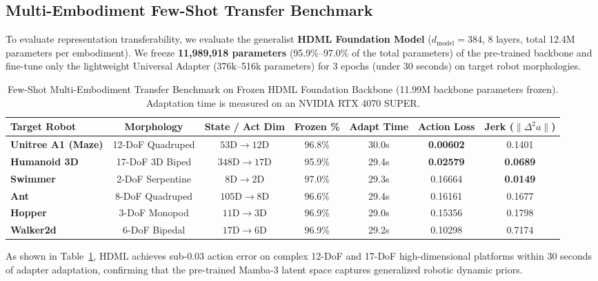 \documentclass{article}
\begin{document}
\subsection{Multi-Embodiment Few-Shot Transfer Benchmark}
To evaluate representation transferability, we evaluate the generalist \textbf{HDML Foundation Model} ($d_{\text{model}}=384$, 8 layers, total 12.4M parameters per embodiment). We freeze \textbf{11,989,918 parameters} (95.9\%--97.0\% of the total parameters) of the pre-trained backbone and fine-tune only the lightweight Universal Adapter (376k--516k parameters) for 3 epochs (under 30 seconds) on target robot morphologies.

\begin{table}[h]
\centering
\caption{Few-Shot Multi-Embodiment Transfer Benchmark on Frozen HDML Foundation Backbone (11.99M backbone parameters frozen). Adaptation time is measured on an NVIDIA RTX 4070 SUPER.}
\label{tab:foundation_benchmark}
\small
\begin{tabular}{lcccccc}
\toprule
\textbf{Target Robot} & \textbf{Morphology} & \textbf{State / Act Dim} & \textbf{Frozen \%} & \textbf{Adapt Time} & \textbf{Action Loss} & \textbf{Jerk ($\|\Delta^2 a\|$)} \\
\midrule
\textbf{Unitree A1 (Maze)}   & 12-DoF Quadruped    & $53\text{D} \to 12\text{D}$ & 96.8\% & 30.0s & \textbf{0.00602} & 0.1401 \\
\textbf{Humanoid 3D}         & 17-DoF 3D Biped     & $348\text{D} \to 17\text{D}$ & 95.9\% & 29.4s & \textbf{0.02579} & \textbf{0.0689} \\
\textbf{Swimmer}             & 2-DoF Serpentine    & $8\text{D} \to 2\text{D}$   & 97.0\% & 29.3s & 0.16664 & \textbf{0.0149} \\
\textbf{Ant}                 & 8-DoF Quadruped     & $105\text{D} \to 8\text{D}$ & 96.6\% & 29.4s & 0.16161 & 0.1677 \\
\textbf{Hopper}              & 3-DoF Monopod       & $11\text{D} \to 3\text{D}$  & 96.9\% & 29.0s & 0.15356 & 0.1798 \\
\textbf{Walker2d}            & 6-DoF Bipedal       & $17\text{D} \to 6\text{D}$  & 96.9\% & 29.2s & 0.10298 & 0.7174 \\
\bottomrule
\end{tabular}
\end{table}

As shown in Table~\ref{tab:foundation_benchmark}, HDML achieves sub-0.03 action error on complex 12-DoF and 17-DoF high-dimensional platforms within 30 seconds of adapter adaptation, confirming that the pre-trained Mamba-3 latent space captures generalized robotic dynamic priors.
\end{document}
